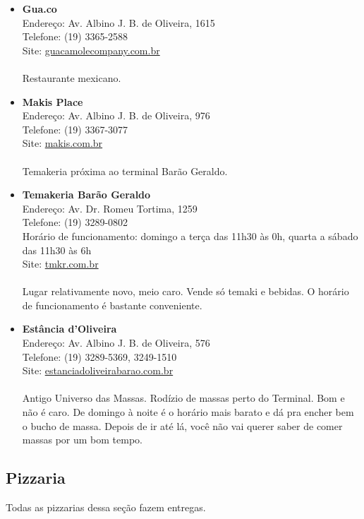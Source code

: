 \begin{itemize}
\item \textbf{Gua.co}
  \\Endereço: Av. Albino J. B. de Oliveira, 1615
  \\Telefone: (19) 3365-2588
  \\Site: \url{guacamolecompany.com.br}
  \\
  \\Restaurante mexicano.

\item \textbf{Makis Place}
  \\Endereço: Av. Albino J. B. de Oliveira, 976
  \\Telefone: (19) 3367-3077
  \\Site: \url{makis.com.br}
  \\
  \\Temakeria próxima ao terminal Barão Geraldo.

\item \textbf{Temakeria Barão Geraldo}
  \\Endereço: Av. Dr. Romeu Tortima, 1259
  \\Telefone: (19) 3289-0802
  \\Horário de funcionamento: domingo a terça das 11h30 às 0h, quarta a
  sábado das 11h30 às 6h
  \\Site: \url{tmkr.com.br}
  \\
  \\Lugar relativamente novo, meio caro. Vende só temaki e bebidas. O horário
  de funcionamento é bastante conveniente.

\item \textbf{Estância d'Oliveira}
  \\Endereço: Av. Albino J. B. de Oliveira, 576
  \\Telefone: (19) 3289-5369, 3249-1510
  \\Site: \url{estanciadoliveirabarao.com.br}
  \\
  \\Antigo Universo das Massas. Rodízio de massas perto do Terminal. Bom e não
  é caro. De domingo à noite é o horário mais barato e dá pra encher bem o
  bucho de massa. Depois de ir até lá, você não vai querer saber de comer
  massas por um bom tempo.
\end{itemize}

\subsection{Pizzaria}

Todas as pizzarias dessa seção fazem entregas.

